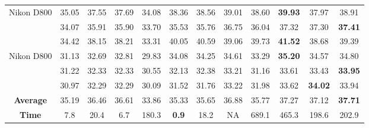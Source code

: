 \begin{table}
\begin{center}
\begin{tabular}{|c||c|c|c|c|c|c|c|c|c|c|c|}
\\
\hline
\multirow{3}{*}{Nikon D800} 
& 35.05 & 37.55 & 37.69 & 34.08 & 38.36 & 38.56 & 39.01 & 38.60 & \textbf{39.93} & 37.97 & 38.91
\\ 
\cline{2-12} 
\multirow{3}{*}{ISO = 3200}   
& 34.07 & 35.91 & 35.90 & 33.70 & 35.53 & 35.76 & 36.75 & 36.04 & 37.32 & 37.30 & \textbf{37.41}
\\ 
\cline{2-12}    
& 34.42 & 38.15 & 38.21 & 33.31 & 40.05 & 40.59 & 39.06 & 39.73 & \textbf{41.52} & 38.68 & 39.39
\\ 
\hline
\multirow{3}{*}{Nikon D800} 
& 31.13 & 32.69 & 32.81 & 29.83 & 34.08 & 34.25 & 34.61 & 33.29 & \textbf{35.20} & 34.57 & 34.80
\\ 
\cline{2-12} 
\multirow{3}{*}{ISO = 6400}   
& 31.22 & 32.33 & 32.33 & 30.55 & 32.13 & 32.38  & 33.21 & 31.16 & 33.61 & 33.43 & \textbf{33.95}
\\ 
\cline{2-12}    
& 30.97 & 32.29 & 32.29 & 30.09 & 31.52 & 31.76 & 33.22 & 31.98 & 33.62 & \textbf{34.02} & 33.94
\\
\hline
\textbf{Average} 
& 35.19 & 36.46 & 36.61 & 33.86 & 35.33 & 35.65 & 36.88 & 35.77 & 37.27 & 37.12 & \textbf{ 37.71}
\\
\hline
\textbf{Time} 
& 7.8 & 20.4 & 6.7 & 180.3 & \textbf{0.9} & 18.2 & NA & 689.1 & 465.3 & 198.6 & 202.9
\\
\hline
\end{tabular}
\end{center}
\end{table}


